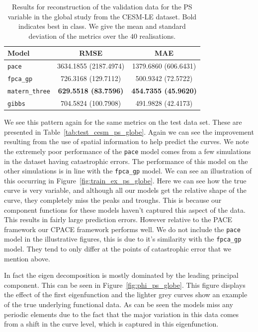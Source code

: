 \begin{table}
	\caption[Results for PS variable on validation data in the Global study]{Results for reconstruction of the validation data for the PS variable in the global study from the CESM-LE dataset. Bold indicates best in class. We give the mean  and standard deviation of the metrics over the $40$  realisations.}
	\centering
	\label{tab:train_cesm_ps_globe}
	\begin{tabular}{lcc}
		\toprule
		\textbf{Model} & \textbf{RMSE} & \textbf{MAE} \\
		\midrule
		\verb*|pace| & 3634.1855 (2187.4974) & 1379.6860 (606.6431) \\
		\verb*|fpca_gp| & 726.3168 (129.7112)& 500.9342	(72.5722)\\
		\verb*|matern_three| & \textbf{629.5518	(83.7596)}& \textbf{454.7355	(45.9620)}\\
		\verb*|gibbs| & 704.5824 (100.7908) & 491.9828 (42.4173)\\
		\bottomrule
	\end{tabular}
\end{table}

We see this pattern again for the same metrics on the test data set.
These are presented in Table~\ref{tab:test_cesm_ps_globe}.
Again we can see the improvement resulting from the use of spatial information to help predict the curves.
We note the extremely poor performance of the \verb*|pace| model comes from a few simulations in the dataset having catastrophic errors.
The performance of this model on the other simulations is in line with the \verb*|fpca_gp| model.
We can see an illustration of this occurring in Figure~\ref{fig:train_ex_ps_globe}.
Here we can see how the true curve is very variable, and although all our models get the relative shape of the curve, they completely miss the peaks and troughs.
This is because our component functions for these models haven't captured this aspect of the data.
This results in fairly large prediction errors.
However relative to the PACE framework our CPACE framework performs well.
We do not include the \verb*|pace| model in the illustrative figures, this is due to it's similarity with the \verb*|fpca_gp| model.
They tend to only differ at the points of catastrophic error that we mention above.

In fact the eigen decomposition is mostly dominated by the leading principal component.
This can be seen in Figure~\ref{fig:phi_ps_globe}.
This figure displays the effect of the first eigenfunction and the lighter grey curves show an example of the true underlying functional data.
As can be seen the models miss any periodic elements due to the fact that the major variation in this data comes from a shift in the curve level, which is captured in this eigenfunction. 


